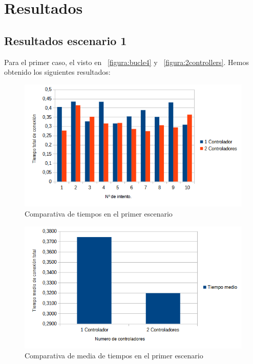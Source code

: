\documentclass[a4paper, 12pt]{book}
\begin{document}
	
	\cleardoublepage
	\chapter{Resultados}
	\label{chap:resultados}
	\section{Resultados escenario 1} 
	\label{sec:resultEsc1}
 
 		Para el primer caso, el visto en ~\ref{figura:bucle4} y ~\ref{figura:2controllers}. Hemos obtenido los siguientes resultados:
 	
 	\begin{figure}[H]
 		\centering
 		\includegraphics[width=16cm, keepaspectratio]{img/comparativabucle4}
 		\caption{Comparativa de tiempos en el primer escenario}
 		\label{figura:comparativabucle4}
 	\end{figure}
 	
 	\begin{figure}[H]
 		\centering
 		\includegraphics[width=16cm, keepaspectratio]{img/comparativamediasbucle}
 		\caption{Comparativa de media de tiempos en el primer escenario}
 		\label{figura:mediabucle4}
 	\end{figure}
 	
\end{document}
